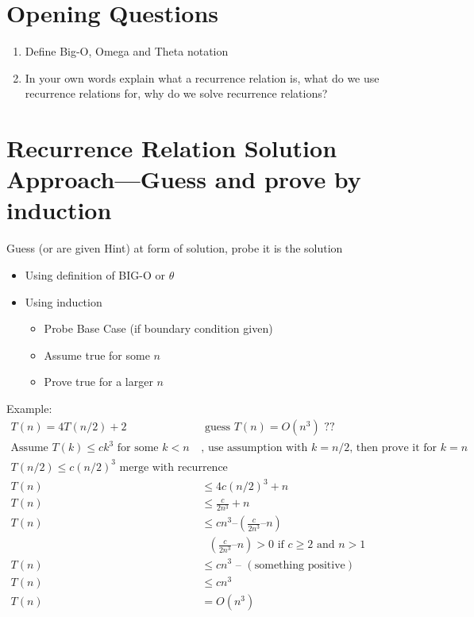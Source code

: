 \documentclass[12pt]{report}
\begin{document}
\section{Opening Questions}\label{sec:opening-questions}
\begin{enumerate}[label=\arabic*.]
    \item Define Big-O, Omega and Theta notation
	\item In your own words explain what a recurrence relation is, what do we use recurrence relations for, why do we solve recurrence relations?
\end{enumerate}

\section{Recurrence Relation Solution Approach—Guess and prove by induction}\label{sec:recurrence-relation-solution-approach----guess-and-prove-by-induction}
Guess (or are given Hint) at form of solution, probe it is the solution
\begin{itemize}
	\item Using definition of BIG-O or $\theta$
	\item Using induction
	\begin{itemize}
		\item Probe Base Case (if boundary condition given)
		\item Assume true for some $n$
		\item Prove true for a larger $n$
	\end{itemize}
\end{itemize}

Example:\begin{equation*}
\begin{aligned}
	T(n)=4T(n/2)+2 &\mbox{ guess }T(n)=O(n^{3})\mbox{ ??}\\
	\mbox{Assume } T(k) \leq ck^{3}\mbox{ for some }k<n&\mbox{, use assumption with }k=n/2\mbox{, then prove it for }k=n\\
	T(n/2) \leq c(n/2)^{3} \mbox{  merge with recurrence}\\
	T(n) &\leq  4 c(n/2)^{3} + n\\
	T(n) &\leq \frac{c}{2n^{3}} + n\\
	T(n) &\leq cn^{3} – \left( \frac{c}{2n^{3}} – n \right)    \\
	               &\mbox{ }\left( \frac{c}{2n^{3}} – n \right) >0\mbox{ if }c\geq 2\mbox{ and }n>1\\
	T(n) &\leq cn^{3} \mbox{ – }(\mbox{something positive})\\
	T(n) &\leq cn^{3}\\
	T(n) &=O(n^{3})
\end{aligned}
\end{equation*}
\end{document}
